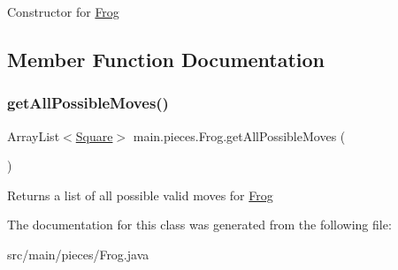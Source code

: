 Constructor for \hyperlink{classmain_1_1pieces_1_1_frog}{Frog} 

\subsection{Member Function Documentation}
\mbox{\label{classmain_1_1pieces_1_1_frog_a89b9515482edd874a06a3b13e90b8f8f}} 
\subsubsection{\texorpdfstring{get\+All\+Possible\+Moves()}{getAllPossibleMoves()}}
{\footnotesize\ttfamily Array\+List$<$\hyperlink{classmain_1_1_square}{Square}$>$ main.\+pieces.\+Frog.\+get\+All\+Possible\+Moves (\begin{DoxyParamCaption}{ }\end{DoxyParamCaption})\hspace{0.3cm}{\ttfamily [inline]}}

Returns a list of all possible valid moves for \hyperlink{classmain_1_1pieces_1_1_frog}{Frog} 

The documentation for this class was generated from the following file\+:\begin{DoxyCompactItemize}
\item 
src/main/pieces/Frog.\+java\end{DoxyCompactItemize}
